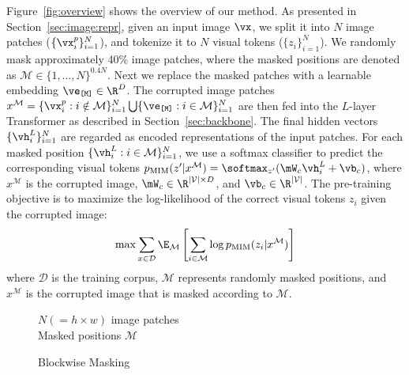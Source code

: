 \documentclass{article}
\begin{document}
Figure~\ref{fig:overview} shows the overview of our method.
As presented in Section~\ref{sec:image:repr}, given an input image $\vx$, we split it into $N$ image patches ($\{\vx^{p}_{i}\}_{i=1}^{N}$), and tokenize it to $N$ visual tokens ($\{z_{i}\}_{i=1}^{N}$).
We randomly mask approximately $40\%$ image patches, where the masked positions are denoted as $\mathcal{M} \in \{1,\dots,N\}^{0.4 N}$.
Next we replace the masked patches with a learnable embedding $\ve_{\sptk{M}} \in \R^{D}$.
The corrupted image patches $ x^{\mathcal{M}} = \{ \vx^p_i : i \notin \mathcal{M} \}_{i=1}^N \bigcup \{ \ve_{\sptk{M}} : i \in \mathcal{M} \}_{i=1}^N$ are then fed into the $L$-layer Transformer as described in Section~\ref{sec:backbone}.
The final hidden vectors $\{ \vh^{L}_{i} \}_{i=1}^{N}$ are regarded as encoded representations of the input patches.
For each masked position $\{ \vh^{L}_{i} : i \in \mathcal{M} \}_{i=1}^{N}$, we use a softmax classifier to predict the corresponding visual tokens $p_{\text{MIM}}( z' | x^{\mathcal{M}} ) = \softmax_{z'} (\mW_{c} \vh^{L}_{i} + \vb_{c})$, where $x^{\mathcal{M}}$ is the corrupted image,  $\mW_{c} \in \R^{|\mathcal{V}| \times D}$, and $\vb_{c} \in \R^{|\mathcal{V}|}$.
The pre-training objective is to maximize the log-likelihood of the correct visual tokens $z_i$ given the corrupted image:
\begin{align}
\max \sum_{x \in \mathcal{D}} \E_{\mathcal{M}} \left[ \sum_{i \in \mathcal{M}} \log p_{\text{MIM}}( z_i | x^{\mathcal{M}} ) \right]
\label{eq:objective}
\end{align}
where $\mathcal{D}$ is the training corpus, $\mathcal{M}$ represents randomly masked positions, and $x^{\mathcal{M}}$ is the corrupted image that is masked according to $\mathcal{M}$.

\begin{figure}
\vspace{-24pt}
\begin{minipage}{0.56\textwidth}
\begin{algorithm}[H]
\small
\caption{Blockwise Masking}
\label{alg:mask}
\begin{algorithmic}
 $N (= h \times w)$ image patches \\
 Masked positions $\mathcal{M}$
\REPEAT{}
\hfill{}
 \hfill{}
\STATE{$\mathcal{M} \gets \mathcal{M} \bigcup \{(i,j) : i \in [t,t+a) , j \in [l,l+b) \}$}
\hfill{}
\end{algorithmic}
\end{algorithm}
\end{minipage}
\vspace{-14pt}
\end{figure}
\end{document}
